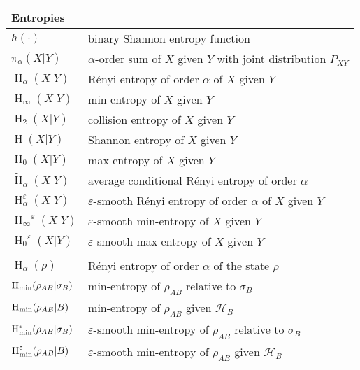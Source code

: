 \documentclass[final,11pt,a4paper]{report}
\newcommand*{\clearemptydoublepage}{\newpage{\pagestyle{empty}\cleardoublepage}}
\newcommand*{\cH}{\mathcal{H}}
\renewcommand*{\H}{\operatorname{H}}   %
\newcommand*{\hmin}{\ensuremath{\H_{\infty}}}
\newcommand*{\hmax}{\ensuremath{\H_{0}}}
\newcommand*{\hie}[2]{\ensuremath{\hmin^{#1}(#2)}}
\newcommand*{\hiee}[1]{\hie{\varepsilon}{#1}}
\newcommand*{\hmaxe}[2]{\ensuremath{\hmax^{#1}(#2)}}
\newcommand*{\hmaxee}[1]{\hmaxe{\varepsilon}{#1}}
\newcommand*{\qhmin}{\ensuremath{\H_{\rm min}}}  %
\newcommand*{\hminee}{\qhmin^{\varepsilon}} %
\newcommand*{\tH}{\tilde{\H}}         %
\newcommand*{\eps}{\varepsilon}
\begin{document}
\begin{tabular}{ll}
\multicolumn{2}{l}{\bf Entropies} \\ \hline
$h(\cdot)$ & binary Shannon \index{entropy!Shannon}entropy function \\
$\pi_\alpha(X|Y)$ & \index{$\alpha$-order sum}$\alpha$-order sum of $X$ given $Y$ with joint
distribution $P_{XY}$\\
$\H_\alpha(X|Y)$ &  R\'enyi \index{entropy!classical R\'enyi}entropy of order $\alpha$ of
$X$ given $Y$\\
$\H_\infty(X|Y)$ &  \index{entropy!min-}min-entropy of $X$ given $Y$\\
$\H_2(X|Y)$ &  \index{entropy!collision}collision entropy of $X$ given $Y$\\
$\H(X|Y)$ &  \index{entropy!Shannon}Shannon entropy of $X$ given $Y$\\
$\H_0(X|Y)$ &  \index{entropy!max-}max-entropy of $X$ given $Y$\\
$\tH_\alpha(X|Y)$ & \index{entropy!average conditional R\'enyi}average conditional R\'enyi entropy of order
$\alpha$\\
$\H_\alpha^\eps(X|Y)$ &  $\eps$-smooth R\'enyi entropy of order
$\alpha$ of $X$ given $Y$\\
$\hiee{X|Y}$ &  \index{entropy!smooth min-}$\eps$-smooth min-entropy of $X$ given $Y$\\
$\hmaxee{X|Y}$ &  $\eps$-smooth max-entropy of $X$ given $Y$\\
\\
$\H_\alpha(\rho)$ & R\'enyi entropy of order $\alpha$ of the state
$\rho$\\
$\qhmin(\rho_{AB} | \sigma_B)$ & min-entropy of $\rho_{AB}$
relative to $\sigma_B$\\
$\qhmin(\rho_{AB} | B)$ & min-entropy of $\rho_{AB}$
given $\cH_B$\\
$\hminee(\rho_{AB} | \sigma_B)$ & $\eps$-smooth min-entropy of $\rho_{AB}$
relative to $\sigma_B$\\
$\hminee(\rho_{AB} | B)$ & $\eps$-smooth min-entropy of $\rho_{AB}$
given $\cH_B$\\ \hline

\end{tabular}



\clearemptydoublepage
{}
{}
 
 
\end{document}
